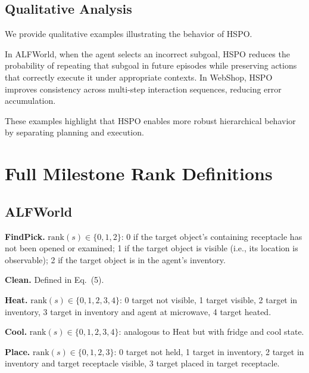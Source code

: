 \documentclass{article}
\newcommand{\wei}[1]{\textcolor{red}{#1}}
\begin{document}
\subsection{Qualitative Analysis}
\label{sec:qualitative}

We provide qualitative examples illustrating the behavior of HSPO.

In ALFWorld, when the agent selects an incorrect subgoal, HSPO reduces the probability of repeating that subgoal in future episodes while preserving actions that correctly execute it under appropriate contexts. In WebShop, HSPO improves consistency across multi-step interaction sequences, reducing error accumulation.

These examples highlight that HSPO enables more robust hierarchical behavior by separating planning and execution.






\appendix %

\section{Full Milestone Rank Definitions}

\subsection{ALFWorld}

\textbf{FindPick.} $\mathrm{rank}(s) \in \{0, 1, 2\}$: 0 if the target object's containing receptacle has not been opened or examined; 1 if the target object is visible (i.e., its location is observable); 2 if the target object is in the agent's inventory.

\textbf{Clean.} Defined in Eq.~(5).

\textbf{Heat.} $\mathrm{rank}(s) \in \{0, 1, 2, 3, 4\}$: 0 target not visible, 1 target visible, 2 target in inventory, 3 target in inventory and agent at microwave, 4 target heated.

\textbf{Cool.} $\mathrm{rank}(s) \in \{0, 1, 2, 3, 4\}$: analogous to Heat but with fridge and cool state.

\textbf{Place.} $\mathrm{rank}(s) \in \{0, 1, 2, 3\}$: 0 target not held, 1 target in inventory, 2 target in inventory and target receptacle visible, 3 target placed in target receptacle.
\end{document}
